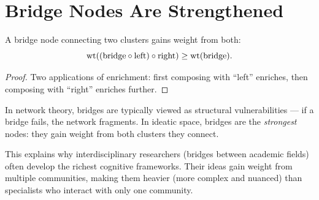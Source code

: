 \section{Bridge Nodes Are Strengthened}

\begin{theorem}
A bridge node connecting two clusters gains weight from both:
\[
\operatorname{wt}((\text{bridge} \circ \text{left}) \circ \text{right}) \geq \operatorname{wt}(\text{bridge}).
\]
\end{theorem}

\begin{proof}
Two applications of enrichment: first composing with ``left'' enriches, then composing with ``right'' enriches further.
\end{proof}

\begin{interpretation}
In network theory, bridges are typically viewed as structural vulnerabilities --- if a bridge fails, the network fragments. In ideatic space, bridges are the \emph{strongest} nodes: they gain weight from both clusters they connect.

This explains why interdisciplinary researchers (bridges between academic fields) often develop the richest cognitive frameworks. Their ideas gain weight from multiple communities, making them heavier (more complex and nuanced) than specialists who interact with only one community.
\end{interpretation}
